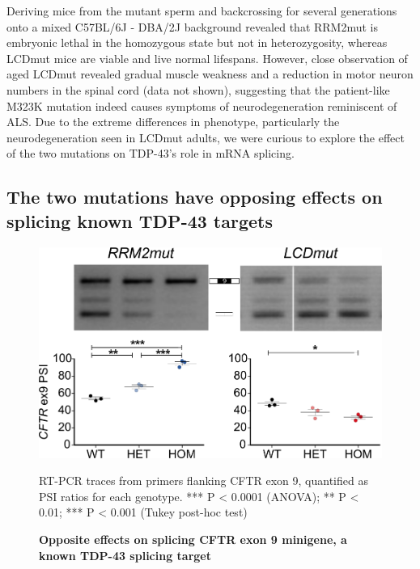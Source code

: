 Deriving mice from the mutant sperm and backcrossing for several generations onto a mixed C57BL/6J - DBA/2J background revealed that RRM2mut is embryonic lethal in the homozygous state but not in heterozygosity, whereas LCDmut mice are viable and live normal lifespans. However, close observation of aged LCDmut revealed gradual muscle weakness and a reduction in motor neuron numbers in the spinal cord (data not shown), suggesting that the patient-like M323K mutation indeed causes symptoms of neurodegeneration reminiscent of ALS. 
Due to the extreme differences in phenotype, particularly the neurodegeneration seen in LCDmut adults, we were curious to explore the effect of the two mutations on TDP-43's role in mRNA splicing.

\subsection{The two mutations have opposing effects on splicing known TDP-43 targets}

\begin{figure}[h!]
	\centering
	\includegraphics[width=12cm]{Figures/05_tdp_mice/CFTR.png}
	\caption{\textbf{Opposite effects on splicing CFTR exon 9 minigene, a known TDP-43 splicing target}}
	RT-PCR traces from primers flanking CFTR exon 9, quantified as PSI ratios for each genotype. *** P < 0.0001 (ANOVA); ** P < 0.01; *** P < 0.001 (Tukey post-hoc test)	
	\label{fig:CFTR}
\end{figure}

